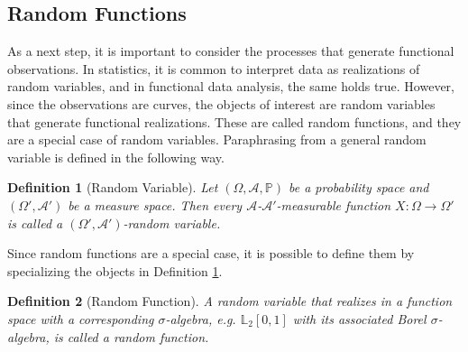 \documentclass[12pt, a4paper]{article}
\theoremstyle{MAstyle} \newtheorem{assumption}{Assumption}[section]
\theoremstyle{MAstyle} \newtheorem{definition}{Definition}[section]
\theoremstyle{MAstyle} \newtheorem{theorem}{Theorem}[section]
\begin{document}
		\subsection{Random Functions}
			As a next step, it is important to consider the processes that generate functional observations. In statistics, it is common to interpret data as realizations of random variables, and in functional data analysis, the same holds true. However, since the observations are curves, the objects of interest are random variables that generate functional realizations. These are called random functions, and they are a special case of random variables. Paraphrasing from \cite{bauer_probability_2011} a general random variable is defined in the following way.
			\begin{definition}[Random Variable]\label{rand_var}
				Let $\left(\Omega, \mathcal{A}, \mathbb{P}\right)$ be a probability space and $\left(\Omega', \mathcal{A}'\right)$ be a measure space. Then every $\mathcal{A}$-$\mathcal{A}'$-measurable function $X:\Omega \rightarrow \Omega'$ is called a $\left(\Omega', \mathcal{A}'\right)$-random variable.
			\end{definition}
			Since random functions are a special case, it is possible to define them by specializing the objects in Definition \ref{rand_var}.
			\begin{definition}[Random Function]
				A random variable that realizes in a function space with a corresponding $\sigma$-algebra, e.g. $\mathbb{L}_2[0,1]$ with its associated Borel $\sigma$-algebra, is called a random function.
			\end{definition}
		
\end{document}
